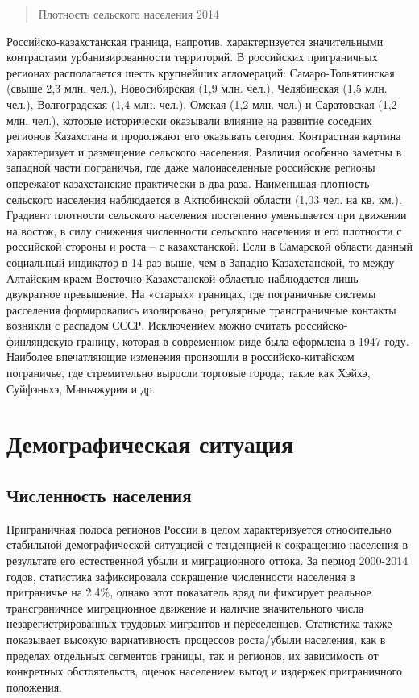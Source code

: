 \documentclass[]{book}
\begin{document}
\begin{quote}
Плотность сельского населения 2014
\end{quote}

Российско-казахстанская граница, напротив, характеризуется значительными
контрастами урбанизированности территорий. В российских приграничных
регионах располагается шесть крупнейших агломераций: Самаро-Тольятинская
(свыше 2,3 млн. чел.), Новосибирская (1,9 млн. чел.), Челябинская (1,5
млн. чел.), Волгоградская (1,4 млн. чел.), Омская (1,2 млн. чел.) и
Саратовская (1,2 млн. чел.), которые исторически оказывали влияние на
развитие соседних регионов Казахстана и продолжают его оказывать
сегодня. Контрастная картина характеризует и размещение сельского
населения. Различия особенно заметны в западной части пограничья, где
даже малонаселенные российские регионы опережают казахстанские
практически в два раза. Наименьшая плотность сельского населения
наблюдается в Актюбинской области (1,03 чел. на кв. км.). Градиент
плотности сельского населения постепенно уменьшается при движении на
восток, в силу снижения численности сельского населения и его плотности
с российской стороны и роста -- с казахстанской. Если в Самарской
области данный социальный индикатор в 14 раз выше, чем в
Западно-Казахстанской, то между Алтайским краем Восточно-Казахстанской
областью наблюдается лишь двукратное превышение. На «старых» границах,
где пограничные системы расселения формировались изолировано, регулярные
трансграничные контакты возникли с распадом СССР. Исключением можно
считать российско-финляндскую границу, которая в современном виде была
оформлена в 1947 году. Наиболее впечатляющие изменения произошли в
российско-китайском пограничье, где стремительно выросли торговые
города, такие как Хэйхэ, Суйфэньхэ, Маньчжурия и др.

\hypertarget{demo-situ}{%
\section{Демографическая ситуация}\label{demo-situ}}

\hypertarget{demo-situ-pop}{%
\subsection{Численность населения}\label{demo-situ-pop}}

Приграничная полоса регионов России в целом характеризуется относительно
стабильной демографической ситуацией с тенденцией к сокращению населения
в результате его естественной убыли и миграционного оттока. За период
2000-2014 годов, статистика зафиксировала сокращение численности
населения в приграничье на 2,4\%, однако этот показатель вряд ли
фиксирует реальное трансграничное миграционное движение и наличие
значительного числа незарегистрированных трудовых мигрантов и
переселенцев. Статистика также показывает высокую вариативность
процессов роста/убыли населения, как в пределах отдельных сегментов
границы, так и регионов, их зависимость от конкретных обстоятельств,
оценок населением выгод и издержек приграничного положения.
\end{document}
